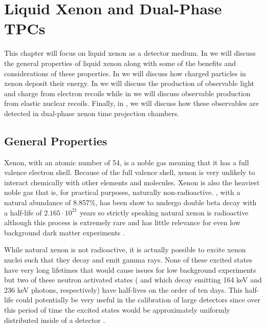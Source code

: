 

\pagestyle{cu}
\graphicspath{{./Chapter2/images/}}

\chapter[Liquid Xenon and Dual-Phase TPCs][Liquid Xenon and Dual-Phase TPCs]{Liquid Xenon and Dual-Phase TPCs}

This chapter will focus on liquid xenon as a detector medium.  In  we will discuss the general properties of liquid xenon along with some of the benefits and considerations of these properties.  In  we will discuss how charged particles in xenon deposit their energy.  In  we will discuss the production of observable light and charge from electron recoils while in  we will discuss observable production from elastic nuclear recoils.  Finally, in , we will discuss how these observables are detected in dual-phase xenon time projection chambers.

\section{General Properties}
\label{sec:lxe_chem_properties}

Xenon, with an atomic number of 54, is a noble gas meaning that it has a full valence electron shell.  Because of the full valence shell, xenon is very unlikely to interact chemically with other elements and molecules.  Xenon is also the heaviest noble gas that is, for practical purposes, naturally non-radioactive.  , with a natural abundance of 8.857\%, has been show to undergo double beta decay with a half-life of $2.165 \cdot 10^{21}$ years so strictly speaking natural xenon is radioactive although this process is extremely rare and has little relevance for even low background dark matter experiments \cite{albert2014improved}.

While natural xenon is not radioactive, it is actually possible to excite xenon nuclei such that they decay and emit gamma rays.  None of these excited states have very long lifetimes that would cause issues for low background experiments but two of these neutron activated states ( and  which decay emitting 164 keV and 236 keV photons, respectively) have half-lives on the order of ten days.  This half-life could potentially be very useful in the calibration of large detectors since over this period of time the excited states would be approximately uniformly distributed inside of a detector \cite{ni2007preparation}.

